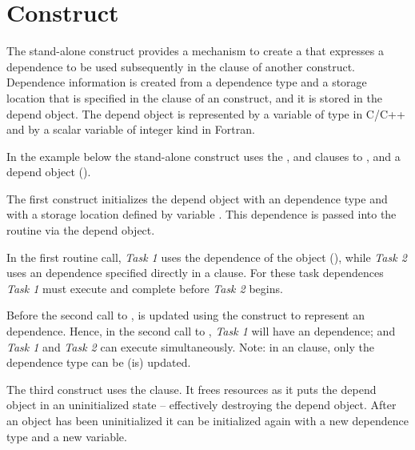 \section{ Construct}
\label{sec:depobj}

The stand-alone  construct provides a mechanism 
to create a  that expresses a dependence to be 
used subsequently in the  clause of another construct.
Dependence information is created from a dependence type and a storage location
that is specified in the  clause of an  construct,
and it is stored in the depend object.
The depend object is represented by a variable of type  
in C/C++ and by a scalar variable of integer kind  in Fortran.

In the example below the stand-alone  construct uses the 
,  and  clauses to 
,  and 
a depend object ().

The first  construct initializes the  
depend object with 
an  dependence type and with a storage
location defined by variable .  
This dependence is passed into the  
routine via the  depend object.

In the first  routine call, \emph{Task 1} uses
the dependence of the object (), 
while \emph{Task 2} uses an  dependence specified 
directly in a  clause.
For these task dependences \emph{Task 1} must execute and 
complete before \emph{Task 2} begins.

Before the second call to ,  is updated 
using the  construct to represent an  dependence. 
Hence, in the second call to , \emph{Task 1}
will have an  dependence; and \emph{Task 1} and 
\emph{Task 2} can execute simultaneously. Note: in an 
clause, only the dependence type can be (is) updated.

The third  construct uses the  clause.
It frees resources as it puts the depend object in an uninitialized state --
effectively destroying the depend object.
After an object has been uninitialized it can be initialized again
with a new dependence type and a new variable.



